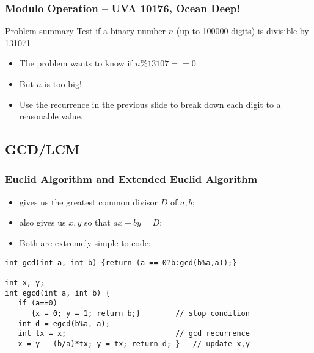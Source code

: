 \documentclass{beamer}
\begin{document}
\begin{frame}
  \frametitle{Modulo Operation -- UVA 10176, Ocean Deep!}
  {\smaller
  \begin{block}{Problem summary}
    Test if a binary number $n$ (up to 100000 digits) is divisible by 131071
  \end{block}

  \begin{itemize}
  \item The problem wants to know if $n\%13107 == 0$
  \item But $n$ is too big!

  \item Use the recurrence in the previous slide to break down each
    digit to a reasonable value.
  \end{itemize}}

\end{frame}

\subsection{GCD/LCM}
\begin{frame}[fragile]
  \frametitle{Euclid Algorithm and Extended Euclid Algorithm}

  {\smaller  
    \begin{itemize}
    \item {} gives us the greatest common divisor $D$ of $a,b$;
    \item {} also gives us $x,y$ so that $ax+by = D$;
    \item Both are extremely simple to code:
    \end{itemize}
    
    \vfill

    \begin{exampleblock}{}
\begin{verbatim}
int gcd(int a, int b) {return (a == 0?b:gcd(b%a,a));}

int x, y;
int egcd(int a, int b) { 
   if (a==0) 
      {x = 0; y = 1; return b;}        // stop condition
   int d = egcd(b%a, a); 
   int tx = x;                         // gcd recurrence
   x = y - (b/a)*tx; y = tx; return d; }   // update x,y
\end{verbatim}
    \end{exampleblock}
}
\end{frame}
\end{document}
